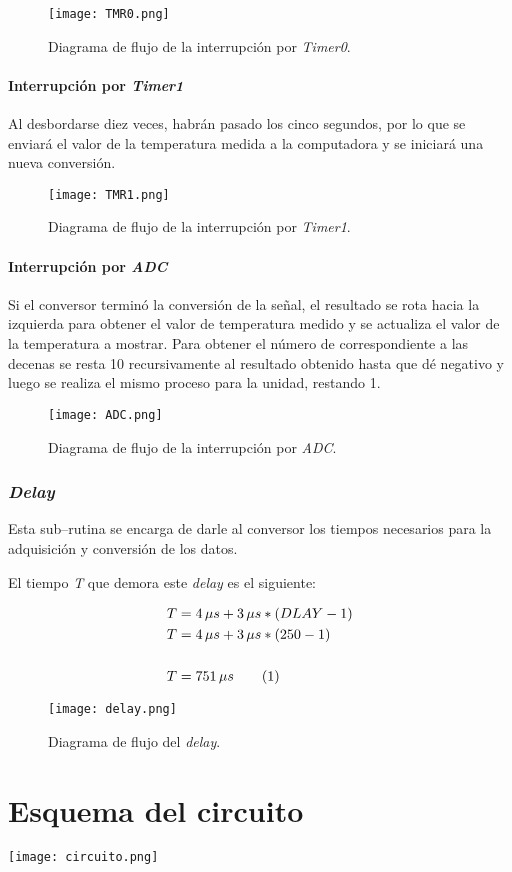 \documentclass[12pt,a4paper]{article}
\newcommand\numberthis{\addtocounter{equation}{1}\tag{\theequation}}
\begin{document}
	\begin{figure}[H]
	\texttt{[image: TMR0.png]}
	\centering
	\caption{Diagrama de flujo de la interrupción por \emph{Timer0}.}
	\label{TM0}
	\end{figure}
	
	\newpage
	\paragraph{Interrupción por \emph{Timer1}} Al desbordarse diez veces, habrán pasado los cinco segundos, por lo que se enviará el valor de la temperatura medida a la computadora y se iniciará una nueva conversión.
	
	\begin{figure}[H]
	\texttt{[image: TMR1.png]}
	\centering
	\caption{Diagrama de flujo de la interrupción por \emph{Timer1}.}
	\label{TM1}
	\end{figure}
	
	\paragraph{Interrupción por \emph{ADC}} Si el conversor terminó la conversión de la señal, el resultado se rota hacia la izquierda para obtener el valor de temperatura medido y se actualiza el valor de la temperatura a mostrar. Para obtener el número de correspondiente a las decenas se resta 10 recursivamente al resultado obtenido hasta que dé negativo y luego se realiza el mismo proceso para la unidad, restando 1.
	
	\begin{figure}[H]
	\texttt{[image: ADC.png]}
	\centering
	\caption{Diagrama de flujo de la interrupción por \emph{ADC}.}
	\label{ADC}
	\end{figure}
	
	\subsubsection{\emph{Delay}}
	Esta sub--rutina se encarga de darle al conversor los tiempos necesarios para la adquisición y conversión de los datos.
	
	El tiempo \emph{T} que demora este \emph{delay} es el siguiente:
	
	\begin{align*}
	T &= 4\, \mu s + 3\,\mu s * (DLAY - 1)\\
	T &= 4\, \mu s + 3\,\mu s * (250 - 1)\\
	\\T &= 751\, \mu s \numberthis
	\end{align*}
	
	\begin{figure}[H]
	\texttt{[image: delay.png]}
	\centering
	\caption{Diagrama de flujo del \emph{delay}.}
	\end{figure}

\newpage
\section{Esquema del circuito}
\centering
\texttt{[image: circuito.png]}
	
\end{document}
